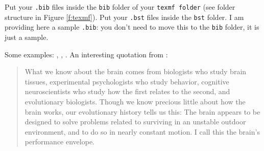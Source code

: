 \documentclass[12pt,a4paper]{article}
\begin{document}
Put your \texttt{.bib} files inside the \texttt{bib} folder of your \texttt{texmf folder} (see folder structure in Figure \ref{f:texmf}). Put your \texttt{.bst} files inside the \texttt{bst} folder. I am providing here a sample \texttt{.bib}: you don't need to move this to the \texttt{bib} folder, it is just a sample.

Some examples: \citet{capra1983}, \citep{dunleavy2003}, \citep[p. 1--10]{medina2008}. An interesting quotation from \citet[p. 4--5]{medina2008}:

\begin{quotation}
What we know about the brain comes from biologists who study brain tissues, experimental psychologists who study behavior, cognitive neuroscientists who study how the first relates to the second, and evolutionary biologists. Though we know precious little about how the brain works, our evolutionary history tells us this: The brain appears to be designed to solve problems related to surviving in an unstable outdoor environment, and to do so in nearly constant motion. I call this the brain’s performance envelope.
\end{quotation}






\end{document}
